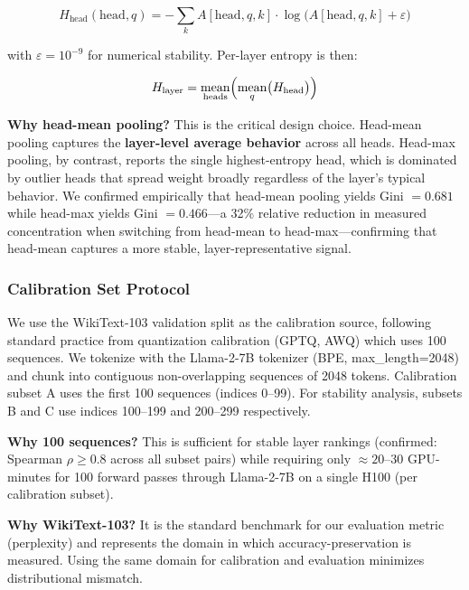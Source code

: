 \begin{equation}
H_{\text{head}}(\text{head}, q) = -\sum_{k} A[\text{head}, q, k] \cdot \log\bigl(A[\text{head}, q, k] + \varepsilon\bigr)
\end{equation}

with $\varepsilon = 10^{-9}$ for numerical stability. Per-layer entropy is then:

\begin{equation}
H_{\text{layer}} = \underset{\text{heads}}{\text{mean}} \Bigl( \underset{q}{\text{mean}} \bigl( H_{\text{head}} \bigr) \Bigr)
\end{equation}

\textbf{Why head-mean pooling?} This is the critical design choice. Head-mean pooling captures the \textbf{layer-level average behavior} across all heads. Head-max pooling, by contrast, reports the single highest-entropy head, which is dominated by outlier heads that spread weight broadly regardless of the layer's typical behavior. We confirmed empirically that head-mean pooling yields Gini $= 0.681$ while head-max yields Gini $= 0.466$---a 32\% relative reduction in measured concentration when switching from head-mean to head-max---confirming that head-mean captures a more stable, layer-representative signal.

\subsubsection{Calibration Set Protocol}

We use the WikiText-103 validation split as the calibration source, following standard practice from quantization calibration (GPTQ, AWQ) which uses 100 sequences. We tokenize with the Llama-2-7B tokenizer (BPE, max\_length=2048) and chunk into contiguous non-overlapping sequences of 2048 tokens. Calibration subset A uses the first 100 sequences (indices 0--99). For stability analysis, subsets B and C use indices 100--199 and 200--299 respectively.

\textbf{Why 100 sequences?} This is sufficient for stable layer rankings (confirmed: Spearman $\rho \geq 0.8$ across all subset pairs) while requiring only $\approx 20$--30 GPU-minutes for 100 forward passes through Llama-2-7B on a single H100 (per calibration subset).

\textbf{Why WikiText-103?} It is the standard benchmark for our evaluation metric (perplexity) and represents the domain in which accuracy-preservation is measured. Using the same domain for calibration and evaluation minimizes distributional mismatch.

